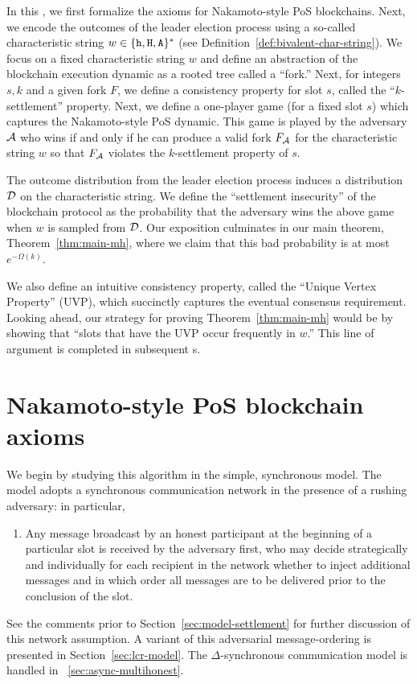 

In this \Section, 
we first formalize the axioms for Nakamoto-style PoS blockchains. 
Next, we encode the outcomes of the leader election process 
using a so-called characteristic string $w \in \{\mathtt{h}, \mathtt{H}, \mathtt{A}\}^*$ 
(see Definition~\ref{def:bivalent-char-string}). 
We focus on a fixed characteristic string $w$ 
and define an abstraction of the blockchain execution dynamic 
as a rooted tree called a ``fork.'' 
Next, for integers $s, k$ and a given fork $F$, 
we define a consistency property for slot $s$, 
called the ``$k$-settlement'' property.
Next, we define a one-player game (for a fixed slot $s$)
which captures the Nakamoto-style PoS dynamic.
This game is played by the adversary $\mathcal{A}$ 
who wins if and only if he can produce a valid fork $F_{\mathcal{A}}$ 
for the characteristic string $w$ so that 
$F_{\mathcal{A}}$ violates the $k$-settlement property of $s$. 

The outcome distribution from the leader election process 
induces a distribution $\mathcal{D}$ on the characteristic string. 
We define the ``settlement insecurity'' of the blockchain protocol 
as the probability 
that the adversary wins the above game 
when $w$ is sampled from $\mathcal{D}$.
Our exposition culminates in our main theorem, 
Theorem~\ref{thm:main-mh}, 
where we claim that this bad probability is at most $e^{-\Omega(k)}$.

We also define an intuitive consistency property, 
called the ``Unique Vertex Property'' (UVP), 
which succinctly captures the eventual consensus requirement. 
Looking ahead, our strategy for proving Theorem~\ref{thm:main-mh} 
would be by showing that ``slots that have the UVP occur frequently in $w$.'' 
This line of argument is completed in subsequent {\Section}s.


\section{Nakamoto-style PoS blockchain axioms}\label{sec:pos-axioms}

  We begin by studying this algorithm in the simple, synchronous model. 
  The model adopts a
  synchronous communication network in the presence of a rushing
  adversary: in particular,
  \begin{enumerate}[label={\textbf{A\arabic*}}., ref={\textbf{A\arabic*}}, series=axiom, start = 0]
    \item\label{axiom:message-delivery} 
    Any message broadcast by an honest participant at the beginning of a
    particular slot is received by the adversary first, who may decide
    strategically and individually for each recipient in the network
    whether to inject additional messages and in which order all messages
    are to be delivered prior to the conclusion of the slot. 
  \end{enumerate}
  See the comments prior to Section~\ref{sec:model-settlement} for
  further discussion of this network assumption.  A variant of this
  adversarial message-ordering is presented in
  Section~\ref{sec:lcr-model}.  The $\Delta$-synchronous communication
  model is handled in \Section~\ref{sec:async-multihonest}.


